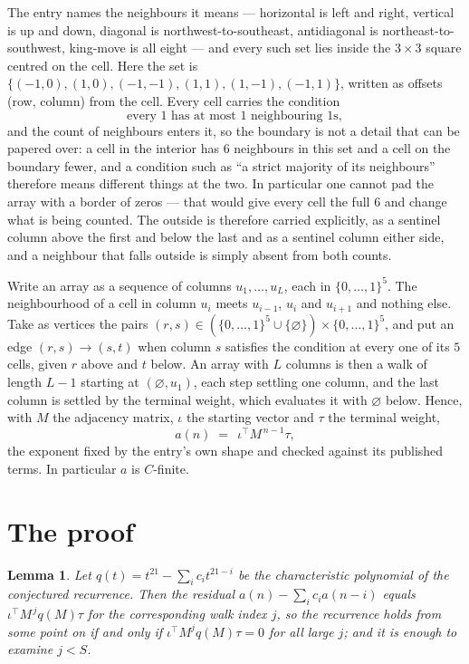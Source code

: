 \documentclass[11pt,a4paper]{article}
\theoremstyle{plain}
\newtheorem{lemma}[theorem]{Lemma}
\theoremstyle{definition}
\begin{document}
The entry names the neighbours it means --- horizontal is left and right, vertical is up and
down, diagonal is northwest-to-southeast, antidiagonal is northeast-to-southwest, king-move is
all eight --- and every such set lies inside the $3\times3$ square centred on the cell. Here
the set is $\{(-1,0), (1,0), (-1,-1), (1,1), (1,-1), (-1,1)\}$, written as offsets (row, column) from the cell. Every cell carries
the condition
\[
\text{every 1 has at most 1 neighbouring 1s},
\]
and the count of neighbours enters it, so the boundary is not a detail that can be papered
over: a cell in the interior has $6$ neighbours in this set and a cell on the boundary
fewer, and a condition such as ``a strict majority of its neighbours'' therefore means
different things at the two. In particular one cannot pad the array with a border of zeros ---
that would give every cell the full $6$ and change what is being counted. The outside is
therefore carried
explicitly, as a sentinel column above the first and below the last and as a sentinel column
either side, and a neighbour that falls outside is simply absent from both counts.

Write an array as a sequence of columns $u_1,\dots,u_L$, each in
$\{0,\dots,1\}^{5}$. The neighbourhood of a cell in column $u_i$ meets $u_{i-1}$,
$u_i$ and $u_{i+1}$ and nothing else. Take as vertices the pairs
$(r,s)\in(\{0,\dots,1\}^{5}\cup\{\varnothing\})\times\{0,\dots,1\}^{5}$,
and put an edge $(r,s)\to(s,t)$ when column $s$ satisfies the condition at every one of its
$5$ cells, given $r$ above and $t$ below. An array with $L$ columns is then a walk of length
$L-1$ starting at $(\varnothing,u_1)$, each step settling one column, and the last column is
settled by the terminal weight, which evaluates it with $\varnothing$ below. Hence,
with $M$ the adjacency matrix, $\iota$ the starting vector and $\tau$ the terminal weight,
\[
a(n)\;=\;\,\iota^{\!\top}M^{\,n-1}\tau ,
\]
the exponent fixed by the entry's own shape and checked against its published terms. In
particular $a$ is $C$-finite.

\section{The proof}

\begin{lemma}\label{lem:crit}
Let $q(t)=t^{21}-\sum_i c_it^{21-i}$ be the characteristic polynomial of the
conjectured recurrence. Then the residual $a(n)-\sum_ic_ia(n-i)$ equals
$\iota^{\!\top}M^{\,j}q(M)\tau$ for the corresponding walk index $j$, so the
recurrence holds from some point on if and only if $\iota^{\!\top}M^{j}q(M)\tau=0$ for all
large $j$; and it is enough to examine $j<S$.
\end{lemma}
\end{document}
